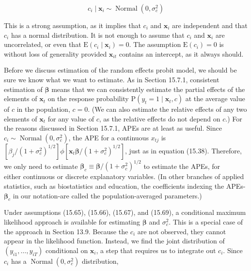 \documentclass[10pt]{article}
\begin{document}
\begin{equation*}
c_{i} \mid \mathbf{x}_{i} \sim \operatorname{Normal}\left(0, \sigma_{c}^{2}\right) \tag{15.69}
\end{equation*}


This is a strong assumption, as it implies that $c_{i}$ and $\mathbf{x}_{i}$ are independent and that $c_{i}$ has a normal distribution. It is not enough to assume that $c_{i}$ and $\mathbf{x}_{i}$ are uncorrelated, or even that $\mathrm{E}\left(c_{i} \mid \mathbf{x}_{i}\right)=0$. The assumption $\mathrm{E}\left(c_{i}\right)=0$ is without loss of generality provided $\mathbf{x}_{i t}$ contains an intercept, as it always should.

Before we discuss estimation of the random effects probit model, we should be sure we know what we want to estimate. As in Section 15.7.1, consistent estimation of $\boldsymbol{\beta}$ means that we can consistently estimate the partial effects of the elements of $\mathbf{x}_{t}$ on the response probability $\mathrm{P}\left(y_{t}=1 \mid \mathbf{x}_{t}, c\right)$ at the average value of $c$ in the population, $c=0$. (We can also estimate the relative effects of any two elements of $\mathbf{x}_{t}$ for any value of $c$, as the relative effects do not depend on $c$.) For the reasons discussed in Section 15.7.1, APEs are at least as useful. Since $c_{i} \sim \operatorname{Normal}\left(0, \sigma_{c}^{2}\right)$, the APE for a continuous $x_{t j}$ is $\left[\beta_{j} /\left(1+\sigma_{c}^{2}\right)^{1 / 2}\right] \phi\left[\mathbf{x}_{t} \boldsymbol{\beta} /\left(1+\sigma_{c}^{2}\right)^{1 / 2}\right]$, just as in equation (15.38). Therefore, we only need to estimate $\boldsymbol{\beta}_{c} \equiv \boldsymbol{\beta} /\left(1+\sigma_{c}^{2}\right)^{1 / 2}$ to estimate the APEs, for\\
either continuous or discrete explanatory variables. (In other branches of applied statistics, such as biostatistics and education, the coefficients indexing the APEs- $\boldsymbol{\beta}_{c}$ in our notation-are called the population-averaged parameters.)

Under assumptions (15.65), (15.66), (15.67), and (15.69), a conditional maximum likelihood approach is available for estimating $\boldsymbol{\beta}$ and $\sigma_{c}^{2}$. This is a special case of the approach in Section 13.9. Because the $c_{i}$ are not observed, they cannot appear in the likelihood function. Instead, we find the joint distribution of $\left(y_{i 1}, \ldots, y_{i T}\right)$ conditional on $\mathbf{x}_{i}$, a step that requires us to integrate out $c_{i}$. Since $c_{i}$ has a $\operatorname{Normal}\left(0, \sigma_{c}^{2}\right)$ distribution,
\end{document}
